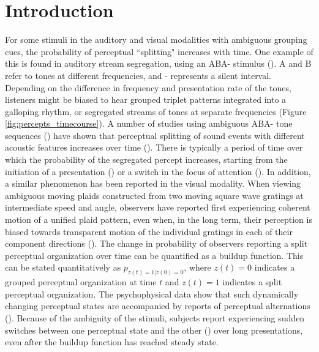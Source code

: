 



\section{Introduction}

For some stimuli in the auditory and visual modalities with ambiguous grouping cues, the probability of perceptual ``splitting" increases with time. One example of this is found in auditory stream segregation, using an ABA- stimulus (\cite{Noorden1975}). A and B refer to tones at different frequencies, and - represents a silent interval. Depending on the difference in frequency and presentation rate of the tones, listeners might be biased to hear grouped triplet patterns integrated into a galloping rhythm, or segregated streams of tones at separate frequencies (Figure \ref{fig:percepts_timecourse}). A number of studies using ambiguous ABA- tone sequences (\cite{Noorden1975}) have shown that perceptual splitting of sound events with different acoustic features increases over time (\cite{Bregman1978, Anstis1985,Cusack2004}). There is typically a period of time over which the probability of the segregated percept increases, starting from the initiation of a presentation (\cite{Bregman1978, Anstis1985}) or a switch in the focus of attention (\cite{Cusack2004}).  In addition, a similar phenomenon has been reported in the visual modality. When viewing ambiguous moving plaids constructed from two moving square wave gratings at intermediate speed and angle, observers have reported first experiencing coherent motion of a unified plaid pattern, even when, in the long term, their perception is biased towards transparent motion of the individual gratings in each of their component directions (\cite{Rubin2004}). The change in probability of observers reporting a split perceptual organization over time can be quantified as a buildup function. This can be stated quantitatively as $p_{z(t)=1|z(0)=0}$, where $z(t)=0$ indicates a grouped perceptual organization at time $t$ and $z(t)=1$ indicates a split perceptual organization. The psychophysical data show that such dynamically changing perceptual states are accompanied by reports of perceptual alternations (\cite{Deike2012}). %
Because of the ambiguity of the stimuli, subjects report experiencing sudden switches between one perceptual state and the other (\cite{Pressnitzer2006, Hupe2012}) over long presentations, even after the buildup function has reached steady state.

